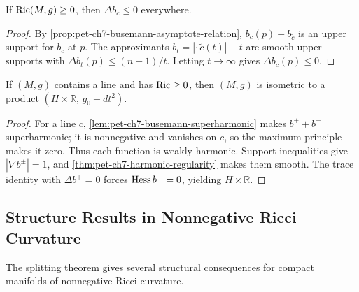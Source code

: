 \begin{lemma}
  \label{lem:pet-ch7-busemann-superharmonic}
  If $\operatorname{Ric}(M,g)\ge0$, then $\Delta b_c\le0$ everywhere.
\end{lemma}
\begin{proof}
  \sketch
  By \cref{prop:pet-ch7-busemann-asymptote-relation}, \(b_c(p)+b_{\widetilde c}\) is an upper support for \(b_c\) at \(p\). The approximants \(b_t=|\cdot\,\widetilde c(t)|-t\) are smooth upper supports with \(\Delta b_t(p)\le(n-1)/t\). Letting \(t\to\infty\) gives \(\Delta b_c(p)\le0\).
\end{proof}

\begin{theorem}
  \label{thm:pet-ch7-splitting-theorem}
  If $(M,g)$ contains a line and has $\operatorname{Ric}\ge0$, then $(M,g)$ is isometric to
  a product $(H\times\mathbb{R},\,g_0+dt^2)$.
\end{theorem}
\begin{proof}
  \sketch
  For a line \(c\), \cref{lem:pet-ch7-busemann-superharmonic} makes \(b^++b^-\) superharmonic; it is nonnegative and vanishes on \(c\), so the maximum principle makes it zero. Thus each function is weakly harmonic. Support inequalities give \(|\nabla b^\pm|=1\), and \cref{thm:pet-ch7-harmonic-regularity} makes them smooth. The trace identity with \(\Delta b^+=0\) forces \(\operatorname{Hess} b^+=0\), yielding \(H\times\mathbb R\).
\end{proof}

\subsection{Structure Results in Nonnegative Ricci Curvature}

The splitting theorem gives several structural consequences for compact
manifolds of nonnegative Ricci curvature.

